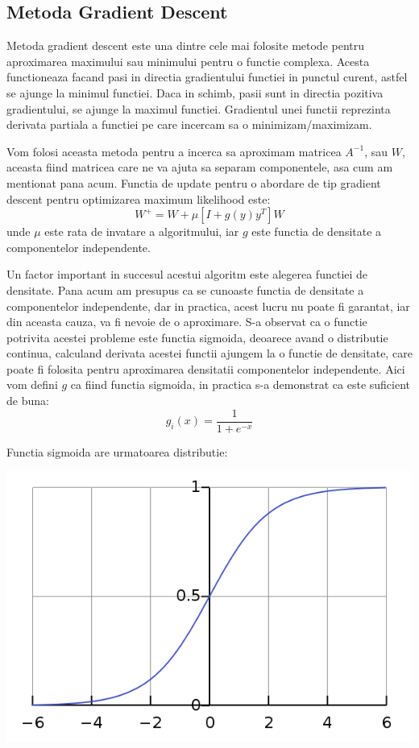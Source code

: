 \documentclass[12pt]{article}
\begin{document}
\subsection{Metoda Gradient Descent}
Metoda gradient descent este una dintre cele mai folosite metode pentru aproximarea maximului sau minimului pentru o functie complexa. Acesta functioneaza facand pasi in directia gradientului functiei in punctul curent, astfel se ajunge la minimul functiei. Daca in schimb, pasii sunt in directia pozitiva gradientului, se ajunge la maximul functiei. Gradientul unei functii reprezinta derivata partiala a functiei pe care incercam sa o minimizam/maximizam. 

Vom folosi aceasta metoda pentru a incerca sa aproximam matricea $A^{-1}$, sau $W$, aceasta fiind matricea care ne va ajuta sa separam componentele, asa cum am mentionat pana acum. Functia de update pentru o abordare de tip gradient descent pentru optimizarea maximum likelihood este:
\begin{equation}
	W^+=W+ \mu [I + g(y) y^T]W
\end{equation}
unde $\mu$ este rata de invatare a algoritmului, iar $g$ este functia de densitate a componentelor independente. 

Un factor important in succesul acestui algoritm este alegerea functiei de densitate. Pana acum am presupus ca se cunoaste functia de densitate a componentelor independente, dar in practica, acest lucru nu poate fi garantat, iar din aceasta cauza, va fi nevoie de o aproximare. S-a observat ca o functie potrivita acestei probleme este functia sigmoida, deoarece avand o distributie continua, calculand derivata acestei functii ajungem la o functie de densitate, care poate fi folosita pentru aproximarea densitatii componentelor independente. Aici vom defini $g$ ca fiind functia sigmoida, in practica s-a demonstrat ca este suficient de buna:
\begin{equation}
	g_i(x)=\frac{1}{1+e^{-x}}
\end{equation}

Functia sigmoida are urmatoarea distributie:
\begin{center}
	\includegraphics[scale=0.6]{sigmoid_function}
 \end{center}
\end{document}
